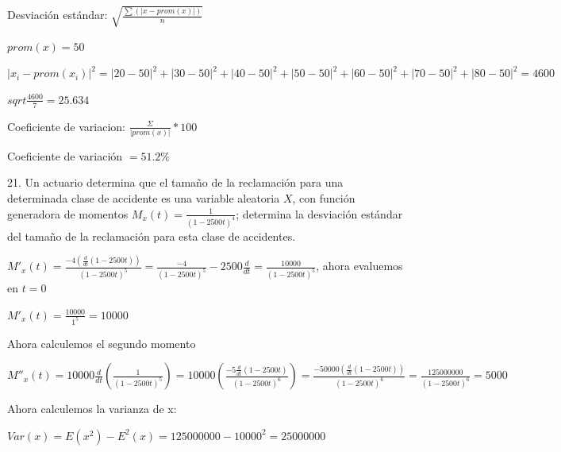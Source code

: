 \documentclass{article}
\begin{document}
        Desviación estándar: $\sqrt{\frac{\displaystyle\sum(|x-prom(x)|)}{n}}$\vspace{.1cm}

        $prom(x) = 50$\vspace{.1cm}

        $|x_{i}-prom(x_{i})|^2 = |20-50|^2 + |30-50|^2 + |40-50|^2 
        + |50-50|^2 + |60-50|^2 + |70-50|^2 + |80-50|^2 = 4600$\vspace{.1cm}

        $sqrt{\frac{4600}{7}} = 25.634$\vspace{.1cm}

        Coeficiente de variacion: $\frac{\Sigma}{|prom(x)|}*100$\vspace{.1cm}

        Coeficiente de variación $= 51.2\%$

        21. Un actuario determina que el tamaño de la reclamación 
        para una determinada clase de accidente es una variable 
        aleatoria $X$, con función generadora de momentos 
        $M_x(t)=\frac{1}{(1-2500t)^4}$; determina la desviación 
        estándar del tamaño de la reclamación para esta clase de 
        accidentes.\vspace{.1cm}

        \vspace{.1cm}

        $M'_x(t)=\frac{-4(\frac{d}{dt}(1-2500t))}{(1-2500t)^5} 
        = \frac{-4}{(1-2500t)^5}-2500\frac{d}{dt} = \frac{10000}{(1-2500t)^5}$, 
        ahora evaluemos en $t=0$ \vspace{.1cm}

        $M'_x(t) = \frac{10000}{1^5}= 10000$\vspace{.1cm}

        Ahora calculemos el segundo momento\vspace{.1cm}

        $M''_x(t) = 10000 \frac{d}{dt}(\frac{1}{(1-2500t)^5}) = 
        10000 (\frac{-5\frac{d}{dt}(1-2500t)}{(1-2500t)^6}) = 
        \frac{-50000(\frac{d}{dt}(1-2500t))}{(1-2500t)^6} = 
        \frac{125000000}{(1-2500t)^6} = 5000$ \vspace{.1cm}

        Ahora calculemos la varianza de x: \vspace{.1cm}

        $Var(x) = E(x^2) - E^2(x) = 125000000 - 10000^2 = 25000000$\vspace{.1cm}
\end{document}
